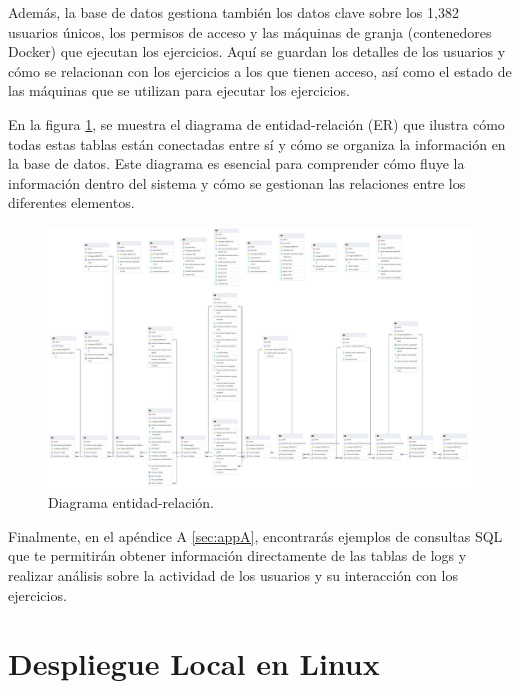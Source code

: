 \documentclass[a4paper, 12pt]{book}
\begin{document}
Además, la base de datos gestiona también los datos clave sobre los 1,382 usuarios únicos, los permisos de acceso y las máquinas de granja (contenedores Docker) que ejecutan los ejercicios. Aquí se guardan los detalles de los usuarios y cómo se relacionan con los ejercicios a los que tienen acceso, así como el estado de las máquinas que se utilizan para ejecutar los ejercicios.

En la figura \ref{fig:ER}, se muestra el diagrama de entidad-relación (ER) que ilustra cómo todas estas tablas están conectadas entre sí y cómo se organiza la información en la base de datos. Este diagrama es esencial para comprender cómo fluye la información dentro del sistema y cómo se gestionan las relaciones entre los diferentes elementos.

\begin{landscape}
    \begin{figure}[H]
        \centering
        \includegraphics[height=0.9\textheight, keepaspectratio]{img/ER.png}
        \caption{Diagrama entidad-relación.}
        \label{fig:ER}
    \end{figure}
\end{landscape}
    


Finalmente, en el apéndice A \ref{sec:appA}, encontrarás ejemplos de consultas SQL que te permitirán obtener información directamente de las tablas de logs y realizar análisis sobre la actividad de los usuarios y su interacción con los ejercicios.

\section{Despliegue Local en Linux}
\end{document}
